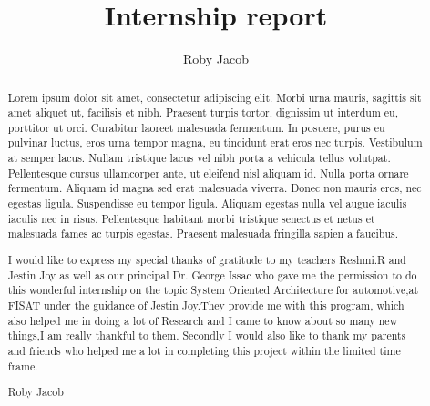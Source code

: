 \documentclass{fisattraining}
\title{Internship report}
\author{Roby Jacob}
\begin{document}
\maketitle
\makecert

\newpage
{}
\setcounter{page}{1}
\thispagestyle{plain}
\renewcommand\abstractname{Company Profile}
\begin{abstract}
\vspace{5cm}
Lorem ipsum dolor sit amet, consectetur adipiscing elit. Morbi urna mauris, sagittis sit amet aliquet ut, facilisis et nibh. Praesent turpis tortor, dignissim ut interdum eu, porttitor ut orci. Curabitur laoreet malesuada fermentum. In posuere, purus eu pulvinar luctus, eros urna tempor magna, eu tincidunt erat eros nec turpis. Vestibulum at semper lacus. Nullam tristique lacus vel nibh porta a vehicula tellus volutpat. Pellentesque cursus ullamcorper ante, ut eleifend nisl aliquam id. Nulla porta ornare fermentum. Aliquam id magna sed erat malesuada viverra. Donec non mauris eros, nec egestas ligula. Suspendisse eu tempor ligula. Aliquam egestas nulla vel augue iaculis iaculis nec in risus. Pellentesque habitant morbi tristique senectus et netus et malesuada fames ac turpis egestas. Praesent malesuada fringilla sapien a faucibus.
\end{abstract}


\newpage
\renewcommand\abstractname{ACKNOWLEDGMENT}
\thispagestyle{plain}
\begin{abstract}
\vspace{5cm}
I would like to express my special thanks of gratitude to my teachers
Reshmi.R and Jestin Joy as well as our principal Dr. George Issac who gave
me the permission to do this wonderful internship on the topic System Oriented Architecture for automotive,at FISAT under the guidance of Jestin Joy.They provide me with this program, which also helped me in doing a lot of Research and I came to know about so many new things,I am really thankful to them. Secondly
I would also like to thank my parents and friends who helped me a lot in
completing this project within the limited time frame.
\vspace{1cm}
\begin{flushright}
Roby Jacob
\end{flushright}
\end{abstract}
\newpage

\restoregeometry
\tableofcontents
\newpage

\cleardoublepage
{}
\listoffigures
\newpage
\end{document}

